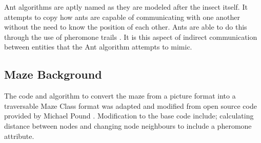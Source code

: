 \documentclass[conference]{IEEEtran}
\begin{document}
    Ant algorithms are aptly named as they are modeled after the insect itself. It attempts to copy how ants are capable of communicating with one another without the need to know the position of each other. Ants are able to do this through the use of pheromone trails \cite{Slides1}. It is this aspect of indirect communication between entities that the Ant algorithm attempts to mimic.
    
    \subsection{Maze Background}
        The code and algorithm to convert the maze from a picture format into a traversable Maze Class format was adapted and modified from open source code provided by Michael Pound \cite{Mazecode}. Modification to the base code include; calculating distance between nodes and changing node neighbours to include a pheromone attribute. 
\end{document}
